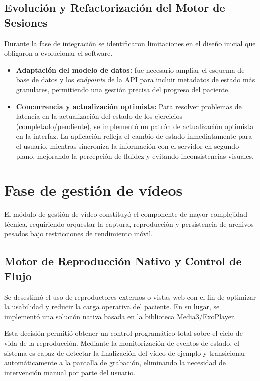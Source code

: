 \subsection{Evolución y Refactorización del Motor de Sesiones}

Durante la fase de integración se identificaron limitaciones en el diseño inicial que obligaron a evolucionar el software.

\begin{itemize}
    \item \textbf{Adaptación del modelo de datos:} fue necesario ampliar el esquema de base de datos y los \textit{endpoints} de la API para incluir metadatos de estado más granulares, permitiendo una gestión precisa del progreso del paciente.
    \item \textbf{Concurrencia y actualización optimista:} Para resolver problemas de latencia en la actualización del estado de los ejercicios (completado/pendiente), se implementó un patrón de actualización optimista en la interfaz. La aplicación refleja el cambio de estado inmediatamente para el usuario, mientras sincroniza la información con el servidor en segundo plano, mejorando la percepción de fluidez y evitando inconsistencias visuales.
\end{itemize}

\section{Fase de gestión de vídeos}

El módulo de gestión de vídeo constituyó el componente de mayor complejidad técnica, requiriendo orquestar la captura, reproducción y persistencia de archivos pesados bajo restricciones de rendimiento móvil.

\subsection{Motor de Reproducción Nativo y Control de Flujo}

Se desestimó el uso de reproductores externos o vistas web con el fin de optimizar la usabilidad y reducir la carga operativa del paciente. En su lugar, se implementó una solución nativa basada en la biblioteca Media3/ExoPlayer.

Esta decisión permitió obtener un control programático total sobre el ciclo de vida de la reproducción. Mediante la monitorización de eventos de estado, el sistema es capaz de detectar la finalización del vídeo de ejemplo y transicionar automáticamente a la pantalla de grabación, eliminando la necesidad de intervención manual por parte del usuario.

